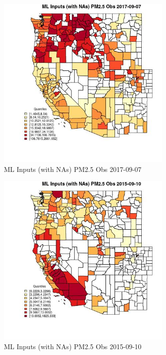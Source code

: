 
\clearpage 

\begin{figure} 
\centering  
\includegraphics[width=0.77\textwidth]{Code_Outputs/Report_ML_input_PM25_Step4_part_e_de_duplicated_aveswNAs_CountyPM25_ObsMean2017-09-07_2017-09-07.jpg} 
\caption{\label{fig:Report_ML_input_PM25_Step4_part_e_de_duplicated_aveswNAsCountyPM25_ObsMean2017-09-07_2017-09-07}ML Inputs (with NAs) PM2.5 Obs 2017-09-07} 
\end{figure} 
 

\begin{figure} 
\centering  
\includegraphics[width=0.77\textwidth]{Code_Outputs/Report_ML_input_PM25_Step4_part_e_de_duplicated_aveswNAs_CountyPM25_ObsMean2015-09-10_2015-09-10.jpg} 
\caption{\label{fig:Report_ML_input_PM25_Step4_part_e_de_duplicated_aveswNAsCountyPM25_ObsMean2015-09-10_2015-09-10}ML Inputs (with NAs) PM2.5 Obs 2015-09-10} 
\end{figure} 
 

